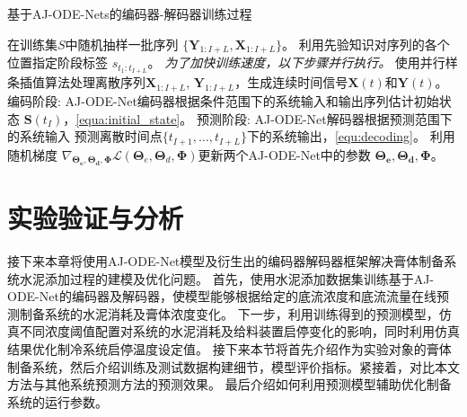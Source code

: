 \begin{algorithm*}[]
\caption{ 基于AJ-ODE-Nets的编码器-解码器训练过程 }
\label{alg:training}
\begin{algorithmic}[1]
\State  在训练集$S$中随机抽样一批序列 $\{\boldsymbol{Y}_{1:I+L}, {\boldsymbol {X}}_{1:I+L}\}$。
\State 利用先验知识对序列的各个位置指定阶段标签 $s_{t_1:t_{I+L}}$。
\State \text{//}\textit{为了加快训练速度，以下步骤并行执行。}
\State 使用并行样条插值算法处理离散序列${\boldsymbol {X}}_{1:I+L}$, $\boldsymbol{Y}_{1:I+L}$，生成连续时间信号$\boldsymbol X(t)$和$\boldsymbol Y(t)$。
\State 编码阶段: AJ-ODE-Net编码器根据条件范围下的系统输入和输出序列估计初始状态 $\boldsymbol{S}\left(t_{I}\right)$，\eqref{equa:initial_state}。
\State 预测阶段: AJ-ODE-Net解码器根据预测范围下的系统输入 预测离散时间点$\{t_{I+1}, \dots, t_{I+L}\}$下的系统输出，\eqref{equ:decoding}。
\State 利用随机梯度 $\nabla_{\boldsymbol{\Theta_{e}}, \boldsymbol{\Theta_{d}}, \boldsymbol \Phi}\mathcal{L}\left(\boldsymbol{\Theta}_{e}, \boldsymbol{\Theta}_{d}, \boldsymbol{\Phi}\right)$更新两个AJ-ODE-Net中的参数 $\boldsymbol{\Theta_{e}}, \boldsymbol{\Theta_{d}}, \boldsymbol \Phi$。
\EndFor
\EndFor
\end{algorithmic}
\end{algorithm*}


\section{实验验证与分析}
\label{sec:4_evalutaion}
接下来本章将使用AJ-ODE-Net模型及衍生出的编码器解码器框架解决膏体制备系统水泥添加过程的建模及优化问题。
首先，使用水泥添加数据集训练基于AJ-ODE-Net的编码器及解码器，使模型能够根据给定的底流浓度和底流流量在线预测制备系统的水泥消耗及膏体浓度变化。
下一步，利用训练得到的预测模型，仿真不同浓度阈值配置对系统的水泥消耗及给料装置启停变化的影响，同时利用仿真结果优化制冷系统启停温度设定值。
接下来本节将首先介绍作为实验对象的膏体制备系统，然后介绍训练及测试数据构建细节，模型评价指标。紧接着，对比本文方法与其他系统预测方法的预测效果。
最后介绍如何利用预测模型辅助优化制备系统的运行参数。


